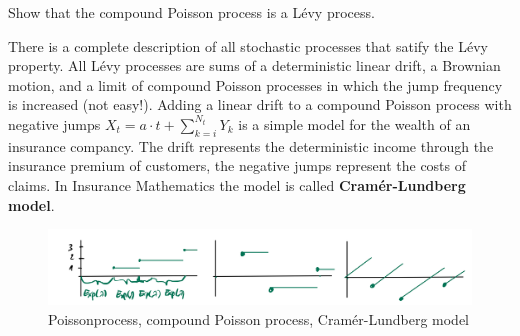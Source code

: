 \begin{luebung}
	Show that the compound Poisson process is a L\'evy process.
\end{luebung}
There is a complete description of all stochastic processes that satify the L\'evy property. All L\'evy processes are sums of a deterministic linear drift, a Brownian motion, and a limit of compound Poisson processes in which the jump frequency is increased (not easy!). Adding a linear drift to a compound Poisson process with negative jumps $X_t=a\cdot t+\sum_{k=i}^{N_t}Y_k$ is a simple model for the wealth of an insurance compancy. The drift represents the deterministic income through the insurance premium of customers, the negative jumps represent the costs of claims. In Insurance Mathematics the model is called \textbf{Cram\'er-Lundberg model}.
\begin{figure}[h]
	\begin{center}
		\includegraphics[scale=0.1]{Levy.jpeg}
		\caption*{Poissonprocess, compound Poisson process, Cram\'er-Lundberg model}
	\end{center}
\end{figure}


